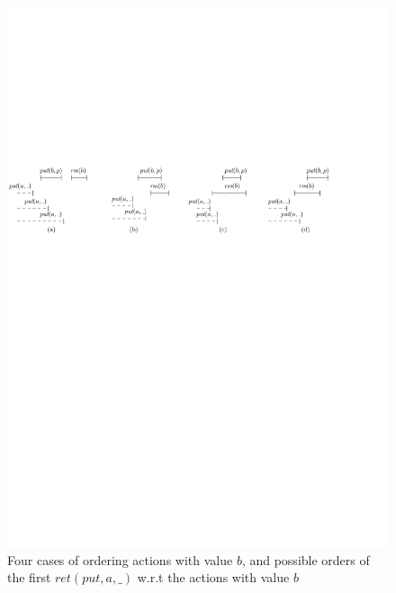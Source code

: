 \begin{figure}[htbp]
  \centering
  \includegraphics[width=1 \textwidth]{figures/PIC_HIS_PQ1Lar-fouCase.pdf}
  \caption{{\color {red}Four cases of ordering actions with value $b$, and possible orders of the first $\textit{ret}(\textit{put},a,\_)$ w.r.t the actions with value $b$}}
  \label{fig:executions APQ1Lar-1 in paper}
\end{figure}


%



